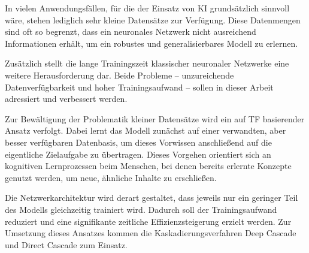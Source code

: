 In vielen Anwendungsfällen, für die der Einsatz von KI grundsätzlich sinnvoll wäre, stehen lediglich sehr kleine Datensätze 
zur Verfügung. Diese Datenmengen sind oft so begrenzt, dass ein neuronales Netzwerk nicht ausreichend Informationen erhält, um ein robustes und 
generalisierbares Modell zu erlernen. %

Zusätzlich stellt die lange Trainingszeit klassischer neuronaler Netzwerke eine weitere Herausforderung dar. Beide Probleme – unzureichende 
Datenverfügbarkeit und hoher Trainingsaufwand – sollen in dieser Arbeit adressiert und verbessert werden.

Zur Bewältigung der Problematik kleiner Datensätze wird ein auf TF basierender Ansatz verfolgt. Dabei lernt das Modell zunächst 
auf einer verwandten, aber besser verfügbaren Datenbasis, um dieses Vorwissen anschließend auf die eigentliche Zielaufgabe zu übertragen. Dieses 
Vorgehen orientiert sich an kognitiven Lernprozessen beim Menschen, bei denen bereits erlernte Konzepte genutzt werden, um neue, ähnliche 
Inhalte zu erschließen. %

Die Netzwerkarchitektur wird derart gestaltet, dass jeweils nur ein geringer Teil des Modells gleichzeitig trainiert wird. Dadurch soll der 
Trainingsaufwand reduziert und eine signifikante zeitliche Effizienzsteigerung erzielt werden. Zur Umsetzung dieses Ansatzes kommen die 
Kaskadierungsverfahren Deep Cascade und Direct Cascade zum Einsatz.
